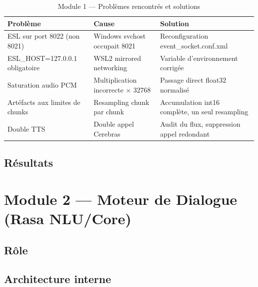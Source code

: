 \begin{table}[H]
  \centering
  \caption{Module 1 — Problèmes rencontrés et solutions}
  \label{tab:m1_issues}
  \begin{tabularx}{\textwidth}{lXX}
    \toprule
    \textbf{Problème} & \textbf{Cause} & \textbf{Solution} \\
    \midrule
    ESL sur port 8022 (non 8021) & Windows svchost occupait 8021 & Reconfiguration event\_socket.conf.xml \\
    ESL\_HOST=127.0.0.1 obligatoire & WSL2 mirrored networking & Variable d'environnement corrigée \\
    Saturation audio PCM & Multiplication incorrecte $\times$ 32768 & Passage direct float32 normalisé \\
    Artéfacts aux limites de chunks & Resampling chunk par chunk & Accumulation int16 complète, un seul resampling \\
    Double TTS & Double appel Cerebras & Audit du flux, suppression appel redondant \\
    \bottomrule
  \end{tabularx}
\end{table}

\subsection{Résultats}


\section{Module 2 — Moteur de Dialogue (Rasa NLU/Core)}

\subsection{Rôle}


\subsection{Architecture interne}


